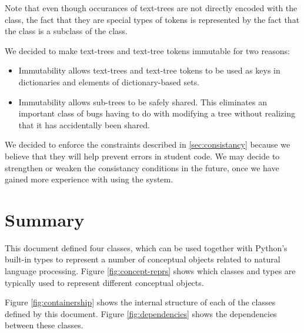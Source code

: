 \documentclass[11pt]{article}
\begin{document}
  \noindent Note that even though occurances of text-trees are not
  directly encoded with the  class, the fact that they are
  special types of tokens is represented by the fact that the
   class is a subclass of the  class.

  \vspace{1mm}\noindent We decided to make text-trees and text-tree
  tokens immutable for two reasons:

  \begin{itemize}

    \item Immutability allows text-trees and text-tree tokens to be
    used as keys in dictionaries and elements of dictionary-based
    sets.

    \item Immutability allows sub-trees to be safely shared.  This
    eliminates an important class of bugs having to do with modifying
    a tree without realizing that it has accidentally been shared.

  \end{itemize}

  We decided to enforce the constraints described in
  \ref{sec:consistancy} because we believe that they will help prevent
  errors in student code.  We may decide to strengthen or weaken the
  consistancy conditions in the future, once we have gained more
  experience with using the system.

\newpage
\section{Summary}
\label{sec:summary}

  This document defined four classes, which can be used together with
  Python's built-in types to represent a number of conceptual objects
  related to natural language processing.  Figure
  \ref{fig:concept-reprs} shows which classes and types are typically
  used to represent different conceptual objects.

  Figure \ref{fig:containership} shows the internal structure of each
  of the classes defined by this document.  Figure
  \ref{fig:dependencies} shows the dependencies between these classes.

\end{document}
